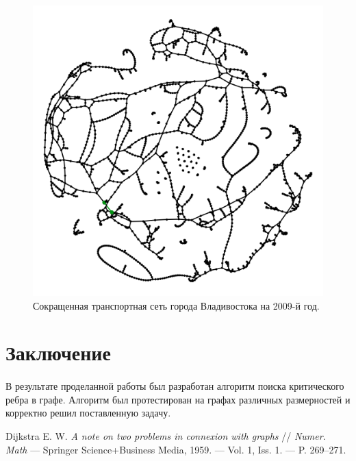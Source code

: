 \documentclass[12pt]{article}
\begin{document}
\begin{figure}[h]
    \centering
    \includegraphics[scale=0.3]{vlad_2009_min.png}
    \caption{Сокращенная транспортная сеть города Владивостока на 2009-й год.}
    \label{fig:vlad_2009_min}
\end{figure}

\section{Заключение}

\paragraph{}
В результате проделанной работы был разработан алгоритм поиска критического ребра в графе.
Алгоритм был протестирован на графах различных размерностей и корректно решил поставленную задачу.

\newpage

\begin{thebibliography}{9}
Dijkstra E. W. \textit{A note on two problems in connexion with graphs} //
\textit{Numer. Math} — Springer Science+Business Media, 1959.
— Vol. 1, Iss. 1. — P. 269–271.
\end{thebibliography}
\end{document}
